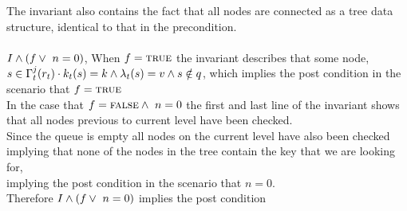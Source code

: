 \documentclass[headings=small,a4paper,12pt]{scrartcl}
\begin{document}
The invariant also contains the fact that all nodes are connected as a tree data structure, identical to that in the precondition.\\
\\
$I\wedge(f\vee~n=0)$, When $f=\text{\textsc{true}}$ the invariant describes that some node,\\ $s\in\Gamma^j_t(r_t)\cdot{}k_t(s) = k\wedge \lambda_t(s) = v\wedge s\notin q$, which implies the post condition in the scenario that $f = \text{\textsc{true}}$\\
In the case that $f=\text{\textsc{false}}\wedge~n=0$ the first and last line of the invariant shows that all nodes previous to current level have been checked.\\ Since the queue is empty all nodes on the current level have also been checked implying that none of the nodes in the tree contain the key that we are looking for,\\ implying the post condition in the scenario that $n=0$.\\
Therefore $I\wedge(f\vee~n=0)$ implies the post condition\\
\break
\end{document}
